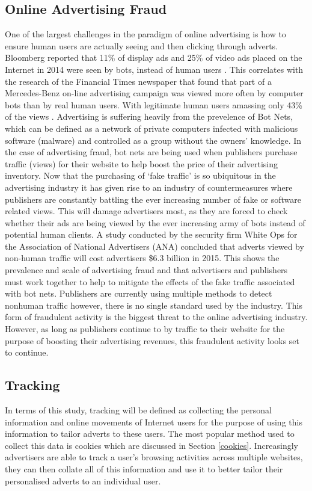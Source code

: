 \documentclass{article}
\begin{document}
\subsection{Online Advertising Fraud}
One of the largest challenges in the paradigm of online advertising is how to ensure human users are actually seeing and then clicking through adverts. Bloomberg reported that 11\% of display ads and 25\% of video ads placed on the Internet in 2014 were seen by bots, instead of human users \parencite{bloomFraud}. This correlates with the research of the Financial Times newspaper that found that part of a Mercedes-Benz on-line advertising campaign was viewed more often by computer bots than by real human users. With legitimate human users amassing only 43\% of the views \parencite{mercFraud}. Advertising is suffering heavily from the prevelence of Bot Nets, which can be defined as a network of private computers infected with malicious software (malware)  and controlled as a group without the owners' knowledge. In the case of advertising fraud, bot nets are being used when publishers purchase traffic (views) for their website to help boost the price of their advertising inventory. Now that the purchasing of `fake traffic' is so ubiquitous in the advertising industry it has given rise to an industry of countermeasures \parencite{bloomFraud} where publishers are constantly battling the ever increasing number of fake or software related views. This will damage advertisers most, as they are forced to check whether their ads are being viewed by the ever increasing army of bots instead of potential human clients. A study conducted by the security firm White Ops for the Association of National Advertisers (ANA) concluded that adverts viewed by non-human traffic will cost advertisers \$6.3 billion in 2015. This shows the prevalence and scale of advertising fraud and that advertisers and publishers must work together to help to mitigate the effects of the fake traffic associated with bot nets. Publishers are currently using multiple methods to detect nonhuman traffic however, there is no single standard used by the industry. This form of fraudulent activity is the biggest threat to the online advertising industry. However, as long as publishers continue to by traffic to their website for the purpose of boosting their advertising revenues, this fraudulent activity looks set to continue. 


\subsection{Tracking}
In terms of this study, tracking will be defined as collecting the personal information and online movements of Internet users for the purpose of using this information to tailor adverts to these users. The most popular method used to collect this data is cookies which are discussed in Section \ref{cookies}. Increasingly advertisers are able to track a user's browsing activities across multiple websites, they can then collate all of this information and use it to better tailor their personalised adverts to an individual user. 
\end{document}
